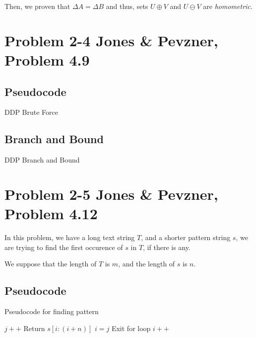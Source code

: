 \documentclass{article}
\begin{document}
Then, we proven that $\Delta A = \Delta B$ and thus, sets $U\oplus V$ and $U \ominus V$ are \textit{homometric}.

\section*{Problem 2-4 Jones \& Pevzner, Problem 4.9}

\subsection*{Pseudocode}

\begin{algorithm}[H]
\caption{DDP Brute Force}
\begin{algorithmic}[1]
\end{algorithmic}
\end{algorithm}

\subsection*{Branch and Bound}

\begin{algorithm}[H]
\caption{DDP Branch and Bound}
\begin{algorithmic}[1]
\end{algorithmic}
\end{algorithm}

\section*{Problem 2-5 Jones \& Pevzner, Problem 4.12}

In this problem, we have a long text string $T$, and a shorter pattern string $s$, we are trying to find the first occurence of $s$ in $T$, if there is any.

We suppose that the length of $T$ is $m$, and the length of $s$ is $n$.

\subsection*{Pseudocode}

\begin{algorithm}[H]
\caption{Pseudocode for finding pattern}
\begin{algorithmic}
       \State $j++$
      \EndIf
       \State Return $s[i:(i+n)]$
      \EndIf
     \EndIf
      \State $i = j$
      \State Exit for loop
     \EndIf
    \EndFor
  \EndIf
   \State $i++$
  \EndIf
 \EndWhile
\EndFunction
\end{algorithmic}
\end{algorithm}
\end{document}

